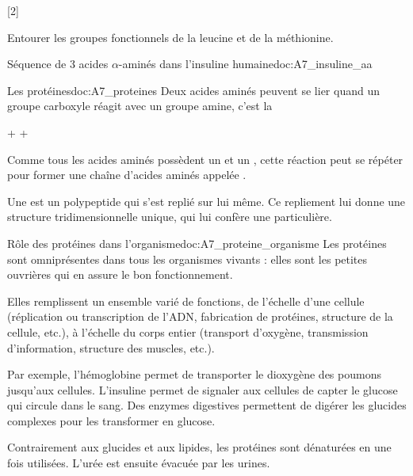 [2]

\numeroQuestion Entourer les groupes fonctionnels de la leucine et de la méthionine.


\begin{doc}{Séquence de 3 acides $\alpha$-aminés dans l'insuline humaine}{doc:A7_insuline_aa}
  \begin{center}
  \end{center}
\end{doc}

\begin{doc}{Les protéines}{doc:A7_proteines}
  Deux acides aminés peuvent se lier quand un groupe carboxyle réagit avec un groupe amine, c'est la 
  
  \begin{center}
     +   
    \reaction
     +
    \eau
  \end{center}
  \vspace*{-4pt}

  Comme tous les acides aminés possèdent un  et un , cette réaction peut se répéter pour former une chaîne d'acides aminés appelée .

  \begin{importants}
    Une  est un polypeptide qui s'est replié sur lui même.
    Ce repliement lui donne une structure tridimensionnelle unique, qui lui confère une  particulière.
  \end{importants}
  \begin{center}
  \end{center}
\end{doc}


\begin{doc}{Rôle des protéines dans l'organisme}{doc:A7_proteine_organisme}
  Les protéines sont omniprésentes dans tous les organismes vivants : elles sont les petites ouvrières qui en assure le bon fonctionnement.
  
  Elles remplissent un ensemble varié de fonctions, de l'échelle d'une cellule (réplication ou transcription de l'ADN, fabrication de protéines, structure de la cellule, etc.), à l'échelle du corps entier (transport d'oxygène, transmission d'information, structure des muscles, etc.).

  Par exemple, l'hémoglobine permet de transporter le dioxygène des poumons jusqu'aux cellules.
  L'insuline permet de signaler aux cellules de capter le glucose qui circule dans le sang.
  Des enzymes digestives permettent de digérer les glucides complexes pour les transformer en glucose.

  Contrairement aux glucides et aux lipides, les protéines sont dénaturées en  une fois utilisées.
  L'urée est ensuite évacuée par les urines.
\end{doc}

